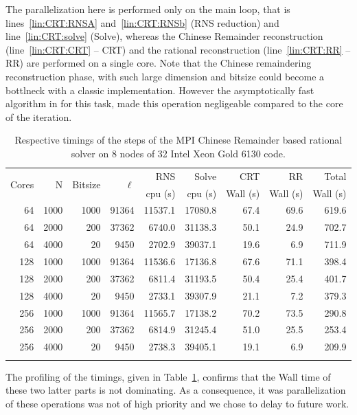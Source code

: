 The parallelization here is performed only on the main loop,
that is lines~\ref{lin:CRT:RNSA} and~\ref{lin:CRT:RNSb} (RNS reduction) and
line~\ref{lin:CRT:solve} (Solve), whereas the Chinese Remainder reconstruction
(line~\ref{lin:CRT:CRT} -- CRT) 
and the rational reconstruction (line~\ref{lin:CRT:RR} -- RR) are
performed on a single core.
Note that the Chinese remaindering reconstruction phase, with such large
dimension and bitsize could become a bottlneck with a classic
implementation. However the asymptotically fast algorithm in \Linbox for this
task, made this operation negligeable compared to the core of the iteration.
%
\begin{table}[htb]
\renewcommand{\arraystretch}{1.1}
\begin{tabular}{rrrrrrrrr}
\hline
\multirow{2}{*}{Cores} & \multirow{2}{*}{N}& \multirow{2}{*}{Bitsize}
& \multirow{2}{*}{$\ell$}& RNS & Solve & CRT& RR & Total \\
 & &  & & cpu (s) & cpu (s) & Wall (s)& Wall (s) & Wall (s) \\
\hline
 64  & 1000 & 1000 & 91364 & 11537.1 & 17080.8 & 67.4 & 69.6 & 619.6 \\
 64  & 2000 & 200& 37362 & 6740.0 & 31138.3 & 50.1 & 24.9 & 702.7 \\
 64  & 4000 & 20 & 9450& 2702.9 & 39037.1 & 19.6 & 6.9& 711.9 \\
 128 & 1000 & 1000 & 91364 & 11536.6 & 17136.8 & 67.6 & 71.1 & 398.4 \\
 128 & 2000 & 200& 37362 & 6811.4 & 31193.5 & 50.4 & 25.4& 401.7 \\
 128 & 4000 & 20 & 9450& 2733.1 & 39307.9 & 21.1 & 7.2& 379.3 \\
 256 & 1000 & 1000 & 91364 & 11565.7 & 17138.2 & 70.2 & 73.5& 290.8 \\
 256 & 2000 & 200& 37362 & 6814.9 & 31245.4 & 51.0 & 25.5 & 253.4 \\
 256 & 4000 & 20 & 9450& 2738.3 & 39405.1 & 19.1 & 6.9& 209.9 \\
\hline
\vspace{0pt}
\end{tabular}
\caption{Respective timings of the steps of the MPI Chinese Remainder based
  rational solver on 8 nodes of 32 Intel Xeon Gold 6130 code.}\label{tab:MPICRT}
\end{table}
The profiling of the timings, given in Table~\ref{tab:MPICRT}, confirms that the
Wall time of these two latter parts is not dominating. As a consequence, it was
parallelization of these operations was not of high priority and we chose to
delay to future work.

